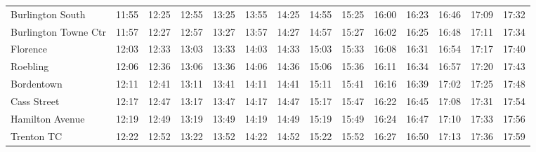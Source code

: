 \begin{center}
\begin{tabular}{@{}lrrrrrrrrrrrrr@{}}
Burlington South & 11:55 & 12:25 & 12:55 & 13:25 & 13:55 & 14:25 & 14:55 & 15:25 & 16:00 & 16:23 & 16:46 & 17:09 & 17:32 \\
Burlington Towne Ctr & 11:57 & 12:27 & 12:57 & 13:27 & 13:57 & 14:27 & 14:57 & 15:27 & 16:02 & 16:25 & 16:48 & 17:11 & 17:34 \\
Florence & 12:03 & 12:33 & 13:03 & 13:33 & 14:03 & 14:33 & 15:03 & 15:33 & 16:08 & 16:31 & 16:54 & 17:17 & 17:40 \\
Roebling & 12:06 & 12:36 & 13:06 & 13:36 & 14:06 & 14:36 & 15:06 & 15:36 & 16:11 & 16:34 & 16:57 & 17:20 & 17:43 \\
Bordentown & 12:11 & 12:41 & 13:11 & 13:41 & 14:11 & 14:41 & 15:11 & 15:41 & 16:16 & 16:39 & 17:02 & 17:25 & 17:48 \\
Cass Street & 12:17 & 12:47 & 13:17 & 13:47 & 14:17 & 14:47 & 15:17 & 15:47 & 16:22 & 16:45 & 17:08 & 17:31 & 17:54 \\
Hamilton Avenue & 12:19 & 12:49 & 13:19 & 13:49 & 14:19 & 14:49 & 15:19 & 15:49 & 16:24 & 16:47 & 17:10 & 17:33 & 17:56 \\
Trenton TC & 12:22 & 12:52 & 13:22 & 13:52 & 14:22 & 14:52 & 15:22 & 15:52 & 16:27 & 16:50 & 17:13 & 17:36 & 17:59 \\
\bottomrule\end{tabular}\end{center}
